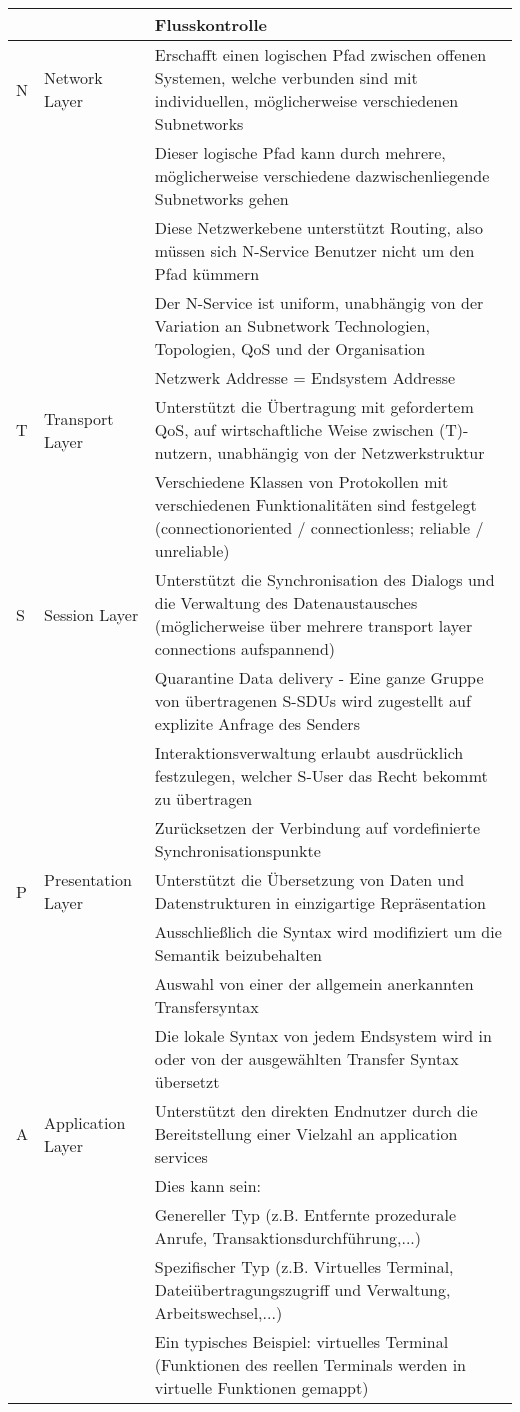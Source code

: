 \documentclass[10pt,landscape]{article}
\begin{document}
\begin{tabular}{l | l | l}
        && Flusskontrolle \\
        \hline
    N & Network Layer & 
        Erschafft einen logischen Pfad zwischen offenen Systemen, welche verbunden sind mit individuellen, möglicherweise verschiedenen Subnetworks\\
        &&Dieser logische Pfad kann durch mehrere, möglicherweise verschiedene dazwischenliegende Subnetworks gehen\\
        &&Diese Netzwerkebene unterstützt Routing, also müssen sich N-Service Benutzer nicht um den Pfad kümmern\\
        &&Der N-Service ist uniform, unabhängig von der Variation an Subnetwork Technologien, Topologien, QoS und der Organisation\\
        &&Netzwerk Addresse = Endsystem Addresse\\
        \hline
    T & Transport Layer & 
        Unterstützt die Übertragung mit gefordertem QoS, auf wirtschaftliche Weise zwischen (T)-nutzern, unabhängig von der Netzwerkstruktur\\
        &&Verschiedene Klassen von Protokollen mit verschiedenen Funktionalitäten sind festgelegt (connectionoriented / connectionless; reliable / unreliable)\\
        \hline
    S & Session Layer &
        Unterstützt die Synchronisation des Dialogs und die Verwaltung des Datenaustausches (möglicherweise über mehrere transport layer connections aufspannend)\\
        &&Quarantine Data delivery - Eine ganze Gruppe von übertragenen S-SDUs wird zugestellt auf explizite Anfrage des Senders\\
        &&Interaktionsverwaltung erlaubt ausdrücklich festzulegen, welcher S-User das Recht bekommt zu übertragen\\
        &&Zurücksetzen der Verbindung auf vordefinierte Synchronisationspunkte\\
        \hline
    P & Presentation Layer &
        Unterstützt die Übersetzung von Daten und Datenstrukturen in einzigartige Repräsentation\\
        &&Ausschließlich die Syntax wird modifiziert um die Semantik beizubehalten\\
        &&Auswahl von einer der allgemein anerkannten Transfersyntax\\
        &&Die lokale Syntax von jedem Endsystem wird in oder von der ausgewählten Transfer Syntax übersetzt\\
        \hline
    A & Application Layer &
        Unterstützt den direkten Endnutzer durch die Bereitstellung einer Vielzahl an application services\\
        &&Dies kann sein:\\
        &&Genereller Typ (z.B. Entfernte prozedurale Anrufe, Transaktionsdurchführung,...)\\
        &&Spezifischer Typ (z.B. Virtuelles Terminal, Dateiübertragungszugriff und Verwaltung, Arbeitswechsel,...)\\
        &&Ein typisches Beispiel: virtuelles Terminal (Funktionen des reellen Terminals werden in virtuelle Funktionen gemappt)\\


\end{tabular}
\end{document}
